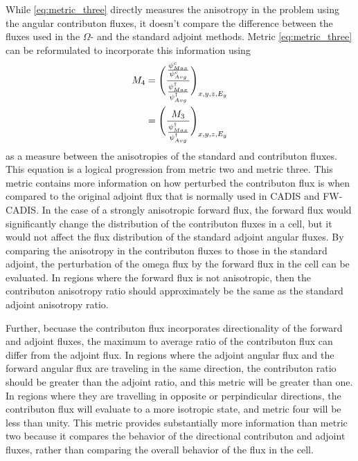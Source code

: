 While \ref{eq:metric_three} directly measures the anisotropy in the problem using
the angular contributon fluxes, it doesn't compare the difference
between the fluxes used
in the $\Omega$-  and the standard adjoint methods. Metric \ref{eq:metric_three}
can be
reformulated to incorporate this information using
%
\begin{equation}
  \begin{split}
    M_{4} & = \Bigg( \frac{\frac{\psi^{c}_{Max}}{\psi^{c}_{
                  Avg}}}{\frac{\psi^{\dagger}_{
                  Max}}{\psi^{\dagger}_{Avg}}} \Bigg)_{x,y,z,E_g} \\
          & = \Bigg(\frac{M_{3}}{\frac{\psi^{\dagger}_{Max}}
                  {\psi^{\dagger}_{Avg}}} \Bigg)_{x,y,z,E_g}
  \end{split}
  \label{eq:metric_four}
\end{equation}
%
as a measure between the anisotropies of the standard and contributon fluxes.
This equation is a logical progression from metric two and
metric three. This metric contains more information on how perturbed the
contributon flux is when compared to the original adjoint flux that is normally
used in CADIS and FW-CADIS.
In the case of a strongly anisotropic
forward flux, the forward flux  would significantly
change the distribution of the contributon
fluxes in a cell, but it would not affect the flux distribution of the standard
adjoint angular fluxes. By comparing the anisotropy in the contributon
fluxes to those in the standard adjoint, the perturbation of the omega flux by
the forward flux
in the cell can be evaluated. In regions where the forward flux is
not anisotropic, then the contributon anisotropy ratio should approximately be
the same as the standard adjoint anisotropy ratio.

Further, becuase the
contributon flux incorporates directionality of the forward and adjoint fluxes,
the maximum to average ratio of the contributon flux can differ from the adjoint
flux. In regions where the adjoint
angular flux and the forward angular flux are traveling in the same direction,
the contributon ratio should be greater than the adjoint ratio, and this metric
will be greater than one. In regions where they are travelling in opposite or
perpindicular directions, the contributon flux will evaluate to a more isotropic
state, and metric four will be less than unity. This metric
provides substantially more information than metric two because
it compares the behavior of the directional contributon and adjoint fluxes,
rather than comparing the overall behavior of the flux in the cell.

